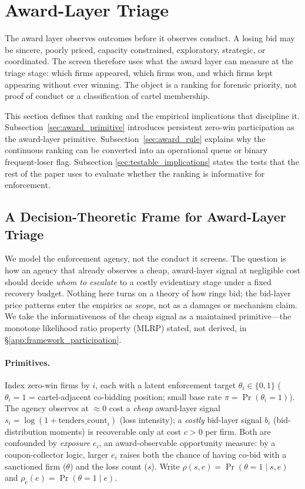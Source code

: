 \section{Award-Layer Triage}
\label{sec:award_screen}

The award layer observes outcomes before it observes conduct. A
losing bid may be sincere, poorly priced, capacity constrained,
exploratory, strategic, or coordinated. The screen therefore
uses what the award layer can measure at the triage stage: which
firms appeared, which firms won, and which firms kept appearing
without ever winning. The object is a ranking for forensic
priority, not proof of conduct or a classification of cartel
membership.

This section defines that ranking and the empirical implications
that discipline it. Subsection~\ref{sec:award_primitive}
introduces persistent zero-win participation as the award-layer
primitive. Subsection~\ref{sec:award_rule} explains why the
continuous ranking can be converted into an operational queue or
binary frequent-loser flag. Subsection
\ref{sec:testable_implications} states the tests that the rest
of the paper uses to evaluate whether the ranking is informative
for enforcement.

\subsection{A Decision-Theoretic Frame for Award-Layer Triage}
\label{sec:triage-model}

We model the enforcement agency, not the conduct it screens. The
question is how an agency that already observes a cheap,
award-layer signal at negligible cost should decide \emph{whom to
escalate} to a costly evidentiary stage under a fixed recovery
budget. Nothing here turns on a theory of how rings bid; the
bid-layer price patterns enter the empirics as \emph{scope}, not
as a damages or mechanism claim. We take the informativeness of
the cheap signal as a maintained primitive---the monotone
likelihood ratio property (MLRP) stated, not derived, in
\S\ref{app:framework_participation}.

\paragraph{Primitives.}
Index zero-win firms by $i$, each with a latent enforcement target
$\theta_i\in\{0,1\}$ ($\theta_i=1$ = cartel-adjacent co-bidding
position; small base rate $\pi=\Pr(\theta_i=1)$). The agency
observes at $\approx 0$ cost a \emph{cheap} award-layer signal
$s_i=\log(1+\text{tenders\_count}_i)$ (loss intensity); a
\emph{costly} bid-layer signal $b_i$ (bid-distribution moments) is
recoverable only at cost $c>0$ per firm. Both are confounded by
\emph{exposure} $e_i$, an award-observable opportunity measure: by
a coupon-collector logic, larger $e_i$ raises both the chance of
having co-bid with a sanctioned firm ($\theta$) and the loss count
($s$). Write $\rho(s,e)=\Pr(\theta=1\mid s,e)$ and
$\rho_e(e)=\Pr(\theta=1\mid e)$.

